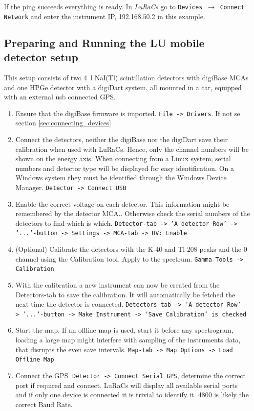 If the ping succeeds everything is ready. In \textit{LuRaCs} go to \texttt{Devices $\rightarrow$ Connect Network} and enter the instrument IP, 192.168.50.2 in this example.

\subsection{Preparing and Running the LU mobile detector setup}
This setup consists of two \qty{4}{\litre} NaI(Tl) scintillation detectors with digiBase MCAs and one HPGe detector with a digiDart system, all mounted in a car, equipped with an external usb connected GPS.

\begin{enumerate}
    \item Ensure that the digiBase firmware is imported. \texttt{File -> Drivers}. If not se section \ref{sec:connecting_devices}
    \item Connect the detectors, neither the digiBase nor the digiDart save their calibration when used with LuRaCs. Hence, only the channel numbers will be shown on the energy axis. When connecting from a Linux system, serial numbers and detector type will be displayed for easy identification. On a Windows system they must be identified through the Windows Device Manager. \texttt{Detector -> Connect USB}
    \item Enable the correct voltage on each detector. This information might be remembered by the detector MCA.. Otherwise check the serial numbers of the detectors to find which is which. \texttt{Detector-tab -> 'A detector Row' -> '...'-button -> Settings -> MCA-tab -> HV: Enable}
    \item (Optional) Calibrate the detectors with the K-40 and Tl-208 peaks and the 0 channel using the Calibration tool. Apply to the spectrum. \texttt{Gamma Tools -> Calibration}
    \item With the calibration a new instrument can now be created from the Detectors-tab to save the calibration. It will automatically be fetched the next time the detector is connected. \texttt{Detectors-tab -> 'A detector Row' -> '...'-button -> Make Instrument -> 'Save Calibration' is checked}
    \item Start the map. If an offline map is used, start it before any spectrogram, loading a large map might interfere with sampling of the instruments data, that disrupts the even save intervals. \texttt{Map-tab -> Map Options -> Load Offline Map}
    \item Connect the GPS. \texttt{Detector -> Connect Serial GPS}, determine the correct port if required and connect. LuRaCs will display all available serial ports and if only one device is connected it is trivial to identify it. 4800 is likely the correct Baud Rate.

\end{enumerate}
